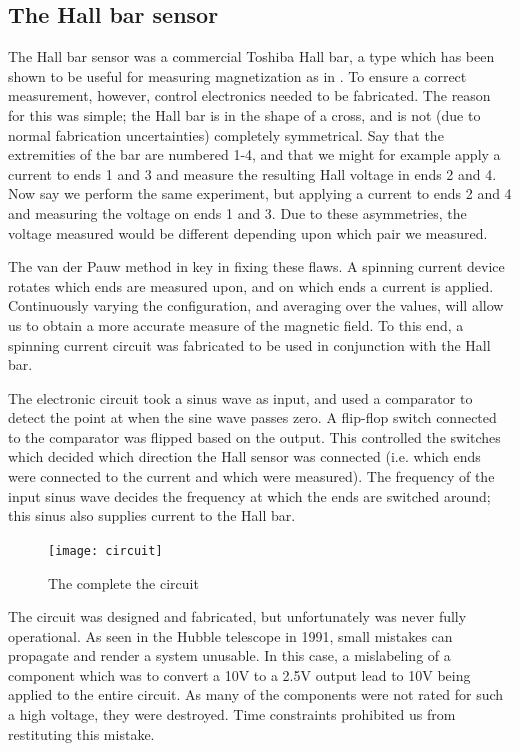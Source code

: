 \documentclass[journal]{IEEEtran}
\begin{document}
\subsection{The Hall bar sensor}
The Hall bar sensor was a commercial Toshiba Hall bar, a type which has been shown to be useful for measuring magnetization as in \cite{nishioka}. To ensure a correct measurement, however, control electronics needed to be fabricated. The reason for this was simple; the Hall bar is in the shape of a cross, and is not (due to normal fabrication uncertainties) completely symmetrical. Say that the extremities of the bar are numbered 1-4, and that we might for example apply a current to ends 1 and 3 and measure the resulting Hall voltage in ends 2 and 4. Now say we perform the same experiment, but applying a current to ends 2 and 4 and measuring the voltage on ends 1 and 3. Due to these asymmetries, the voltage measured would be different depending upon which pair we measured.

The van der Pauw method \cite{pauw} in key in fixing these flaws. A spinning current device \cite{steiner} rotates which ends are measured upon, and on which ends a current is applied. Continuously varying the configuration, and averaging over the values, will allow us to obtain a more accurate measure of the magnetic field. To this end, a spinning current circuit was fabricated to be used in conjunction with the Hall bar.

The electronic circuit took a sinus wave as input, and used a comparator to detect the point at when the sine wave passes zero. A flip-flop switch connected to the comparator was flipped based on the output. This controlled the switches which decided which direction the Hall sensor was connected (i.e. which ends were connected to the current and which were measured). The frequency of the input sinus wave decides the frequency at which the ends are switched around; this sinus also supplies current to the Hall bar. 

\begin{figure}[H]
\texttt{[image: circuit]}
\caption{The complete the circuit}
\end{figure}

The circuit was designed and fabricated, but unfortunately was never fully operational. As seen in the Hubble telescope in 1991, small mistakes can propagate and render a system unusable\cite{hubble}. In this case, a mislabeling of a component which was to convert a 10V to a 2.5V output lead to 10V being applied to the entire circuit. As many of the components were not rated for such a high voltage, they were destroyed. Time constraints prohibited us from restituting this mistake. 
\end{document}
